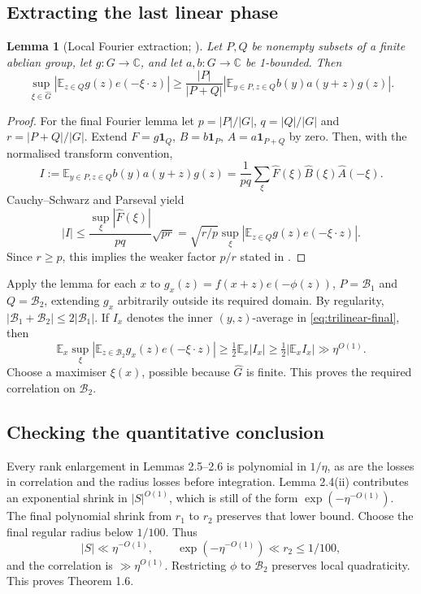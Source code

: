 \documentclass[11pt,a4paper]{article}
\newcommand{\E}{\mathbb E}
\newcommand{\C}{\mathbb C}
\newcommand{\Gh}{\widehat G}
\newcommand{\bb}{\mathcal B}
\newcommand{\abs}[1]{\left|#1\right|}
\newcommand{\poly}{\eta^{O(1)}}
\newcommand{\GT}[1]{\cite[#1]{GT}}
\newtheorem{lemma}{Lemma}[section]
\theoremstyle{definition}
\numberwithin{equation}{section}
\begin{document}
\subsection{Extracting the last linear phase}
\begin{lemma}[Local Fourier extraction; {\GT{Lemma 4.4}}]\label{lem:extraction}
Let $P,Q$ be nonempty subsets of a finite abelian group, let
$g:G\to\C$, and let $a,b:G\to\C$ be 1-bounded. Then
\[
\sup_{\xi\in\Gh}\abs{\E_{z\in Q}g(z)e(-\xi\cdot z)}
\geq\frac{|P|}{|P+Q|}
\abs{\E_{y\in P,z\in Q}b(y)a(y+z)g(z)}.
\]
\end{lemma}
\begin{proof}
For the final Fourier lemma let $p=|P|/|G|$, $q=|Q|/|G|$ and
$r=|P+Q|/|G|$. Extend
$F=g\mathbf1_Q$, $B=b\mathbf1_P$, $A=a\mathbf1_{P+Q}$ by zero.
Then, with the normalised transform convention,
\[
I:=\E_{y\in P,z\in Q}b(y)a(y+z)g(z)
=\frac1{pq}\sum_\xi\widehat F(\xi)\widehat B(\xi)\widehat A(-\xi).
\]
Cauchy--Schwarz and Parseval yield
\[
|I|\leq\frac{\sup_\xi|\widehat F(\xi)|}{pq}\sqrt{pr}
=\sqrt{r/p}\sup_\xi\abs{\E_{z\in Q}g(z)e(-\xi\cdot z)}.
\]
Since $r\geq p$, this implies the weaker factor $p/r$ stated in
\GT{Lemma 4.4}.
\end{proof}
Apply the lemma for each $x$ to
$g_x(z)=f(x+z)e(-\phi(z))$, $P=\bb_1$ and $Q=\bb_2$, extending
$g_x$ arbitrarily outside its required domain. By regularity,
$|\bb_1+\bb_2|\leq2|\bb_1|$. If $I_x$ denotes the inner
$(y,z)$-average in \eqref{eq:trilinear-final}, then
\[
\E_x\sup_\xi\abs{\E_{z\in\bb_2}g_x(z)e(-\xi\cdot z)}
\geq\tfrac12\E_x|I_x|\geq\tfrac12|\E_x I_x|\gg\poly.
\]
Choose a maximiser $\xi(x)$, possible because $\Gh$ is finite.
This proves the required correlation on $\bb_2$.

\subsection{Checking the quantitative conclusion}
Every rank enlargement in Lemmas 2.5--2.6 is polynomial in $1/\eta$,
as are the losses in correlation and the radius losses before
integration. Lemma 2.4(ii) contributes an exponential shrink in
$|S|^{O(1)}$, which is still of the form $\exp(-\eta^{-O(1)})$.
The final polynomial shrink from $r_1$ to $r_2$ preserves that lower
bound. Choose the final regular radius below $1/100$.
Thus
\[
|S|\ll\eta^{-O(1)},\qquad
\exp(-\eta^{-O(1)})\ll r_2\leq1/100,
\]
and the correlation is $\gg\eta^{O(1)}$. Restricting $\phi$ to
$\bb_2$ preserves local quadraticity. This proves Theorem 1.6.
\end{document}
